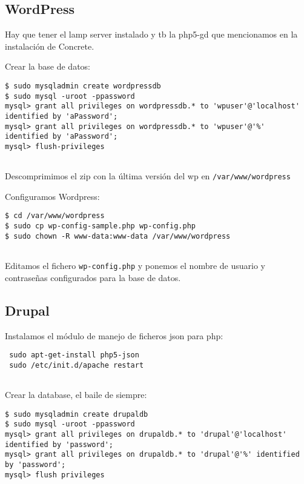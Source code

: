 \subsection{WordPress}\label{wordpress}

Hay que tener el lamp server instalado y tb la php5-gd que mencionamos
en la instalación de Concrete.

Crear la base de datos:

\begin{verbatim}
$ sudo mysqladmin create wordpressdb
$ sudo mysql -uroot -ppassword
mysql> grant all privileges on wordpressdb.* to 'wpuser'@'localhost' identified by 'aPassword';
mysql> grant all privileges on wordpressdb.* to 'wpuser'@'%' identified by 'aPassword';
mysql> flush-privileges
      
\end{verbatim}

Descomprimimos el zip con la última versión del wp en
\texttt{/var/www/wordpress}

Configuramos Wordpress:

\begin{verbatim}
$ cd /var/www/wordpress
$ sudo cp wp-config-sample.php wp-config.php
$ sudo chown -R www-data:www-data /var/www/wordpress
      
\end{verbatim}

Editamos el fichero \texttt{wp-config.php} y ponemos el nombre de
usuario y contraseñas configurados para la base de datos.

\subsection{Drupal}\label{drupal}

Instalamos el módulo de manejo de ficheros json para php:

\begin{verbatim}
 sudo apt-get-install php5-json
 sudo /etc/init.d/apache restart
      
\end{verbatim}

Crear la database, el baile de siempre:

\begin{verbatim}
$ sudo mysqladmin create drupaldb
$ sudo mysql -uroot -ppassword
mysql> grant all privileges on drupaldb.* to 'drupal'@'localhost' identified by 'password';
mysql> grant all privileges on drupaldb.* to 'drupal'@'%' identified by 'password';
mysql> flush privileges
      
\end{verbatim}

